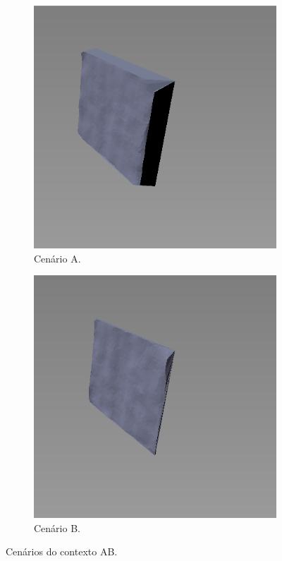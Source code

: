 \begin{figure}[H]
    \centering
    \begin{subfigure}[t]{0.33\textwidth}
        \includegraphics[width=\textwidth]{dados/figuras/AB2.png}
        \caption{Cenário A.}
    \end{subfigure}
    \hspace{1em}
    \begin{subfigure}[t]{0.33\textwidth}
        \includegraphics[width=\textwidth]{dados/figuras/AB1.png}
        \caption{Cenário B.}
    \end{subfigure}
    \caption{Cenários do contexto AB.}
    \label{fig:contexto_ab}
\end{figure}

